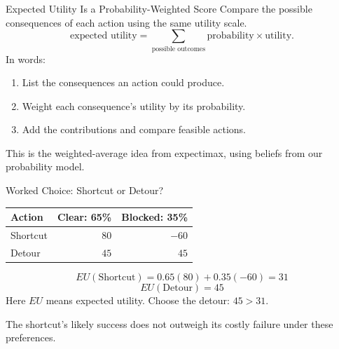 \documentclass[aspectratio=169,10pt]{beamer}
\begin{document}
\begin{frame}{Expected Utility Is a Probability-Weighted Score}
  Compare the possible consequences of each action using the same utility scale.
  \[
    \text{expected utility}
    =\sum_{\text{possible outcomes}}
      \text{probability}\times\text{utility}.
  \]
  In words:
  \begin{enumerate}
    \item List the consequences an action could produce.
    \item Weight each consequence's utility by its probability.
    \item Add the contributions and compare feasible actions.
  \end{enumerate}
  \begin{keyidea}
    This is the weighted-average idea from expectimax, using beliefs from our probability model.
  \end{keyidea}
\end{frame}

\begin{frame}{Worked Choice: Shortcut or Detour?}
  \begin{center}
    \renewcommand{\arraystretch}{1.5}
    \begin{tabular}{l|rr}
      \textbf{Action} & \textbf{Clear: 65\%} & \textbf{Blocked: 35\%} \\\hline
      Shortcut & $80$ & $-60$ \\
      Detour & $45$ & $45$
    \end{tabular}
  \end{center}
  \[
    EU(\text{Shortcut})=0.65(80)+0.35(-60)=31
  \]
  \[
    EU(\text{Detour})=45
  \]
  Here $EU$ means expected utility. Choose the detour: $45>31$.
  \begin{keyidea}
    The shortcut's likely success does not outweigh its costly failure under these preferences.
  \end{keyidea}
\end{frame}
\end{document}
